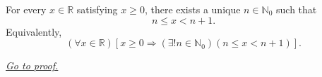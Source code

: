 \begin{lemma}
\label{lem:integer-part-lemma}
For every $x\in\mathbb{R}$ satisfying $x\geq0$, there exists a unique
$n\in\mathbb{N}_0$ such that
\[
  n\leq x<n+1.
\]
Equivalently,
\[
  (\forall x\in\mathbb{R})
  \left[x\geq0\Longrightarrow(\exists!n\in\mathbb{N}_0)(n\leq x<n+1)\right].
\]

\smallskip
\noindent
\hyperref[prf:integer-part-lemma]{\textit{Go to proof.}}
\end{lemma}